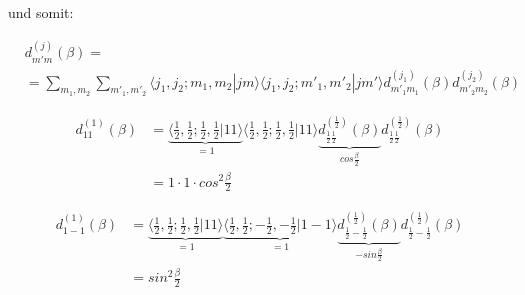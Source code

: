 und somit:



\begin{align}
 &d_{m'm}^{(j)}(\beta)= \\
&= \sum_{m_1,m_2}\sum_{m'_1,m'_2} \langle j_1,j_2;m_1,m_2|jm\rangle \langle j_1,j_2;m'_1,m'_2|jm'\rangle d_{m'_1m_1}^{(j_1)}(\beta)d_{m'_2m_2}^{(j_2)}(\beta)
\end{align}



\begin{align}
  d_{11}^{(1)}(\beta)&= \underbrace{\langle \frac{1}{2},\frac{1}{2};\frac{1}{2},\frac{1}{2}|11\rangle}_{=1} \langle  \frac{1}{2},\frac{1}{2};\frac{1}{2},\frac{1}{2}|11\rangle \underbrace{d_{\frac{1}{2}\frac{1}{2}}^{(\frac{1}{2})}(\beta)}_{cos\frac{\beta}{2}}d_{\frac{1}{2}\frac{1}{2}}^{(\frac{1}{2})}(\beta)\\
&= 1\cdot 1\cdot cos^2\frac{\beta}{2}
\end{align}


\begin{align}
d_{1-1}^{(1)}(\beta)&=\underbrace{\langle \frac{1}{2},\frac{1}{2};\frac{1}{2},\frac{1}{2}|11\rangle}_{=1}\underbrace{ \langle  \frac{1}{2},\frac{1}{2};-\frac{1}{2},-\frac{1}{2}|1-1\rangle}_{=1} \underbrace{d_{\frac{1}{2}-\frac{1}{2}}^{(\frac{1}{2})}(\beta)}_{-sin\frac{\beta}{2}}d_{\frac{1}{2}-\frac{1}{2}}^{(\frac{1}{2})}(\beta)\\
&= sin^2\frac{\beta}{2}
\end{align}







